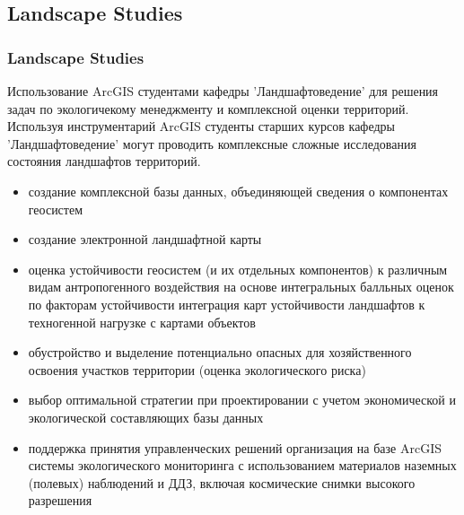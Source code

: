 \documentclass[pdflatex,compress,8pt,
	xcolor={dvipsnames,dvipsnames,svgnames,x11names,table},
	hyperref={	 
	pdfauthor={Lemenkova Polina}, 
	pdfsubject={Preentation}, 
	pdfcreator={Lemenkova Polina}, 
	pdfproducer={Lemenkova Polina}, 
	colorlinks=true,
	linkcolor=Red3, 
	citecolor=NavyBlue, 
	urlcolor = NavyBlue, 
	breaklinks = true}]{beamer}
\begin{document}
\subsection{Landscape Studies}
\begin{frame}\frametitle{Landscape Studies}

\begin{alertblock}{}
Использование ArcGIS студентами кафедры 'Ландшафтоведение' для решения задач по экологичекому менеджменту и комплексной оценки территорий. Используя инструментарий ArcGIS студенты старших курсов кафедры 'Ландшафтоведение' могут проводить комплексные сложные исследования состояния ландшафтов территорий.
	\begin{itemize}
		\item создание комплексной базы данных, объединяющей сведения о компонентах геосистем
		\item создание электронной ландшафтной карты
		\item оценка устойчивости геосистем (и их отдельных компонентов) к различным видам антропогенного воздействия на основе интегральных балльных оценок по факторам устойчивости интеграция карт устойчивости ландшафтов к техногенной нагрузке с картами объектов 
		\item обустройство и выделение потенциально опасных для хозяйственного освоения участков территории (оценка экологического риска) 
		\item выбор оптимальной стратегии при проектировании с учетом экономической и экологической составляющих базы данных
		\item поддержка принятия управленческих решений организация на базе ArcGIS системы экологического мониторинга с использованием материалов наземных (полевых) наблюдений и ДДЗ, включая космические снимки высокого разрешения
	\end{itemize}
\end{alertblock}
\end{frame}
\end{document}
